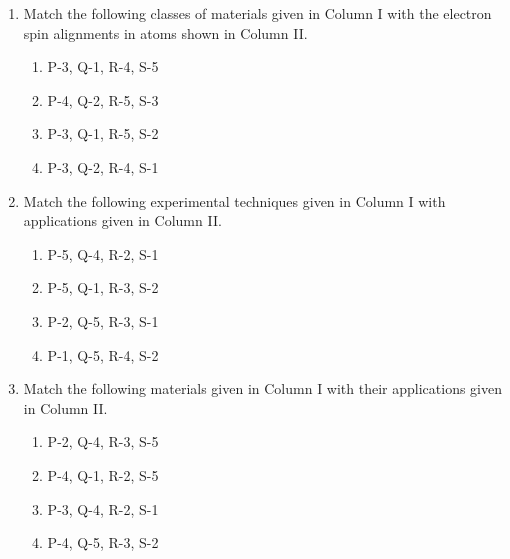 \documentclass[journal,9pt,onecolumn]{IEEEtran}
\begin{document}
\begin{enumerate}
\item Match the following classes of materials given in Column I with the electron spin alignments in atoms shown in Column II.
\begin{table}[h!]
 	\centering
 	
 	\label{tab:Ph-2009}
 \end{table}
\begin{multicols}{4}
\begin{enumerate}
    \item  P-3, Q-1, R-4, S-5
    \item  P-4, Q-2, R-5, S-3
    \item  P-3, Q-1, R-5, S-2
    \item  P-3, Q-2, R-4, S-1
\end{enumerate}
\end{multicols}

\item Match the following experimental techniques given in Column I with applications given in Column II.  
\begin{table}[h!]
 	\centering
 	
 	\label{tab:Ph-2009}
 \end{table}
\begin{multicols}{4}
\begin{enumerate}
    \item  P-5, Q-4, R-2, S-1
    \item  P-5, Q-1, R-3, S-2
    \item  P-2, Q-5, R-3, S-1
    \item  P-1, Q-5, R-4, S-2
\end{enumerate}
\end{multicols}


\item Match the following materials given in Column I with their applications given in Column II.
\begin{table}[h!]
 	\centering
 	
 	\label{tab:Ph-2009}
\end{table}
\begin{multicols}{4}    
\begin{enumerate}
    \item P-2, Q-4, R-3, S-5
    \item P-4, Q-1, R-2, S-5
    \item P-3, Q-4, R-2, S-1
    \item P-4, Q-5, R-3, S-2
\end{enumerate}
\end{multicols}



\end{enumerate}
\end{document}
